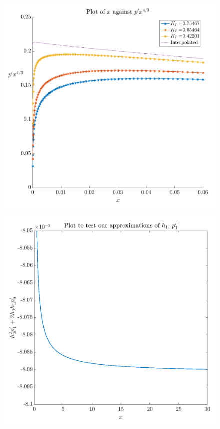 \documentclass{article}
\begin{document}
\begin{figure}[!ht]\centering
\includegraphics[scale=0.3]{pprime-x.png}
\end{figure}
\begin{figure}[!ht]\centering
\includegraphics[scale=0.3]{linear-lubrication.png}
\end{figure}
\end{document}
